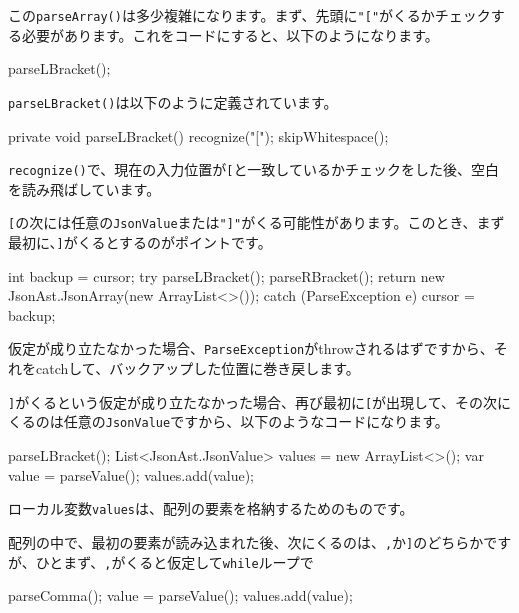 この\texttt{parseArray()}は多少複雑になります。まず、先頭に\texttt{"{[}"}がくるかチェックする必要があります。これをコードにすると、以下のようになります。

\begin{codescreen}{}
parseLBracket();
\end{codescreen}

\texttt{parseLBracket()}は以下のように定義されています。

\begin{codescreen}{}
 private void parseLBracket() {
    recognize("[");
    skipWhitespace();
}
\end{codescreen}

\texttt{recognize()}で、現在の入力位置が\texttt{{[}}と一致しているかチェックをした後、空白を読み飛ばしています。

\texttt{{[}}の次には任意の\texttt{JsonValue}または\texttt{"{]}"}がくる可能性があります。このとき、まず最初に、\texttt{{]}}がくるとするのがポイントです。

\begin{codescreen}{}
        int backup = cursor;
        try {
            parseLBracket();
            parseRBracket();
            return new JsonAst.JsonArray(new ArrayList<>());
        } catch (ParseException e) {
            cursor = backup;
        }
\end{codescreen}

仮定が成り立たなかった場合、\texttt{ParseException}がthrowされるはずですから、それをcatchして、バックアップした位置に巻き戻します。

\texttt{{]}}がくるという仮定が成り立たなかった場合、再び最初に\texttt{{[}}が出現して、その次にくるのは任意の\texttt{JsonValue}ですから、以下のようなコードになります。

\begin{codescreen}{}
        parseLBracket();
        List<JsonAst.JsonValue> values = new ArrayList<>();
        var value = parseValue();
        values.add(value);
\end{codescreen}

ローカル変数\texttt{values}は、配列の要素を格納するためのものです。

配列の中で、最初の要素が読み込まれた後、次にくるのは、\texttt{,}か\texttt{{]}}のどちらかですが、ひとまず、\texttt{,}がくると仮定して\texttt{while}ループで

\begin{codescreen}{}
parseComma();
value = parseValue();
values.add(value);
\end{codescreen}

